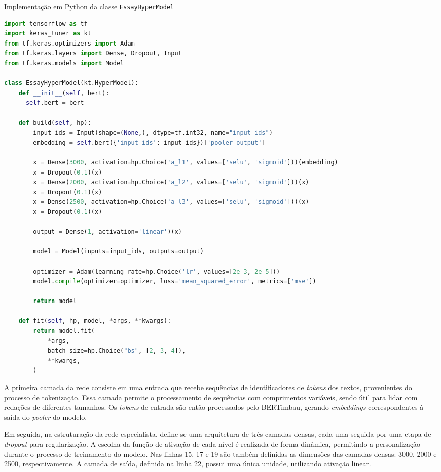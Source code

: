 \begin{program}
    \centering
    \caption{Implementação em Python da classe \texttt{EssayHyperModel}}
    \label{alg:hypermodel}
\begin{lstlisting}[language=Python]
import tensorflow as tf
import keras_tuner as kt
from tf.keras.optimizers import Adam
from tf.keras.layers import Dense, Dropout, Input
from tf.keras.models import Model

class EssayHyperModel(kt.HyperModel):
    def __init__(self, bert):
      self.bert = bert

    def build(self, hp):
        input_ids = Input(shape=(None,), dtype=tf.int32, name="input_ids")
        embedding = self.bert({'input_ids': input_ids})['pooler_output']

        x = Dense(3000, activation=hp.Choice('a_l1', values=['selu', 'sigmoid']))(embedding)
        x = Dropout(0.1)(x)
        x = Dense(2000, activation=hp.Choice('a_l2', values=['selu', 'sigmoid']))(x)
        x = Dropout(0.1)(x)
        x = Dense(2500, activation=hp.Choice('a_l3', values=['selu', 'sigmoid']))(x)
        x = Dropout(0.1)(x)

        output = Dense(1, activation='linear')(x)

        model = Model(inputs=input_ids, outputs=output)

        optimizer = Adam(learning_rate=hp.Choice('lr', values=[2e-3, 2e-5]))
        model.compile(optimizer=optimizer, loss='mean_squared_error', metrics=['mse'])

        return model

    def fit(self, hp, model, *args, **kwargs):
        return model.fit(
            *args,
            batch_size=hp.Choice("bs", [2, 3, 4]),
            **kwargs,
        )
\end{lstlisting}
\end{program}

A primeira camada da rede consiste em uma entrada que recebe sequências de identificadores de \textit{tokens} dos textos, provenientes do processo de tokenização. Essa camada permite o processamento de sequências com comprimentos variáveis, sendo útil para lidar com redações de diferentes tamanhos. Os \textit{tokens} de entrada são então processados pelo BERTimbau, gerando \textit{embeddings} correspondentes à saída do \textit{pooler} do modelo.

Em seguida, na estruturação da rede especialista, define-se uma arquitetura de três camadas densas, cada uma seguida por uma etapa de \textit{dropout} para regularização. A escolha da função de ativação de cada nível é realizada de forma dinâmica, permitindo a personalização durante o processo de treinamento do modelo. Nas linhas 15, 17 e 19 são também definidas as dimensões das camadas densas: 3000, 2000 e 2500, respectivamente. A camada de saída, definida na linha 22, possui uma única unidade, utilizando ativação linear.

